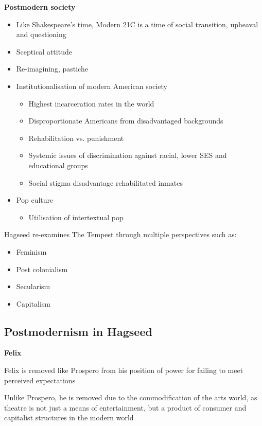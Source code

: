 		\textbf{Postmodern society}
		\begin{itemize}
			\item Like Shakespeare's time, Modern 21C is a time of social transition, upheaval and questioning
			\item Sceptical attitude
			\item Re-imagining, pastiche
			\item Institutionalisation of modern American society
			\begin{itemize}
				\item Highest incarceration rates in the world
				\item Disproportionate Americans from disadvantaged backgrounds
				\item Rehabilitation vs. punishment
				\item Systemic issues of discrimination against racial, lower SES and educational groups
				\item Social stigma disadvantage rehabilitated inmates
			\end{itemize}
			\item Pop culture
			\begin{itemize}
				\item Utilisation of intertextual pop
			\end{itemize}
		\end{itemize}

	Hagseed re-examines The Tempest through multiple perspectives such as:

	\begin{itemize}
		\item Feminism
		\item Post colonialism
		\item Secularism
		\item Capitalism
	\end{itemize}

	\subsection{Postmodernism in Hagseed}
	
		\textbf{Felix}

			Felix is removed like Prospero from his position of power for failing to meet perceived expectations

			Unlike Prospero, he is removed due to the commodification of the arts world, as theatre is not just a means of entertainment, but a product of consumer and capitalist structures in the modern world

